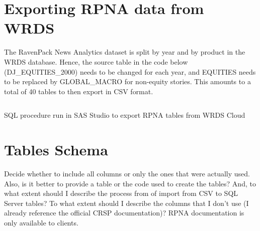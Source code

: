 \section{Exporting RPNA data from WRDS}

The RavenPack News Analytics dataset is split by year and by product in the WRDS database. Hence, the source table in the code below (DJ\_EQUITIES\_2000) needs to be changed for each year, and EQUITIES needs to be replaced by GLOBAL\_MACRO for non-equity stories. This amounts to a total of 40 tables to then export in CSV format.

\begin{listing}[ht]
\inputminted[frame=lines, linenos]{sas}{code/RPNA_export.txt}
\caption{SQL procedure run in SAS Studio to export RPNA tables from WRDS Cloud}
\label{snippet:RPNA}
\end{listing}

\section{Tables Schema}

Decide whether to include all columns or only the ones that were actually used. Also, is it better to provide a table or the code used to create the tables? And, to what extent should I describe the process from of import from CSV to SQL Server tables? To what extent should I describe the columns that I don't use (I already reference the official CRSP documentation)? RPNA documentation is only available to clients. 

%


